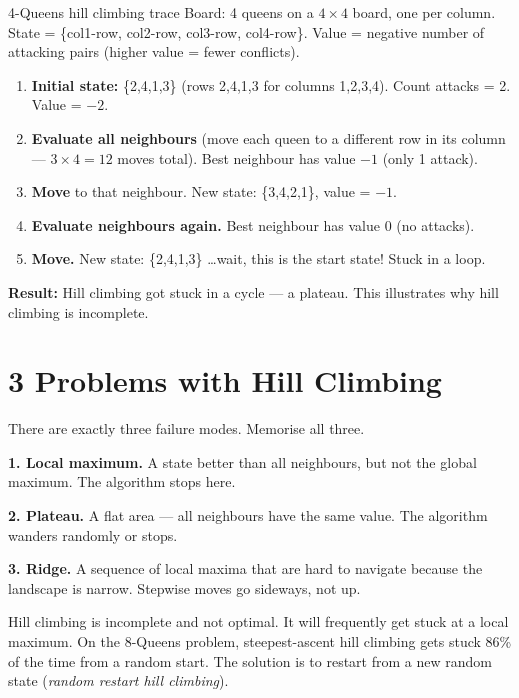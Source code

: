 \documentclass[a4paper,11pt]{article}
\begin{document}
\begin{worked}{4-Queens hill climbing trace}
Board: 4 queens on a $4\times4$ board, one per column. State = \{col1-row, col2-row, col3-row, col4-row\}. Value = negative number of attacking pairs (higher value = fewer conflicts).

\begin{enumerate}[label=\textbf{Step \arabic*.}]
  \item \textbf{Initial state:} \{2,4,1,3\} (rows 2,4,1,3 for columns 1,2,3,4). Count attacks = 2. Value = $-2$.
  \item \textbf{Evaluate all neighbours} (move each queen to a different row in its column — $3 \times 4 = 12$ moves total). Best neighbour has value $-1$ (only 1 attack).
  \item \textbf{Move} to that neighbour. New state: \{3,4,2,1\}, value = $-1$.
  \item \textbf{Evaluate neighbours again.} Best neighbour has value $0$ (no attacks).
  \item \textbf{Move.} New state: \{2,4,1,3\} \ldots wait, this is the start state! Stuck in a loop.
\end{enumerate}
\textbf{Result:} Hill climbing got stuck in a cycle — a plateau. This illustrates why hill climbing is incomplete.
\end{worked}

\section{3 \quad Problems with Hill Climbing}

There are exactly three failure modes. Memorise all three.

\textbf{1. Local maximum.} A state better than all neighbours, but not the global maximum. The algorithm stops here.

\textbf{2. Plateau.} A flat area — all neighbours have the same value. The algorithm wanders randomly or stops.

\textbf{3. Ridge.} A sequence of local maxima that are hard to navigate because the landscape is narrow. Stepwise moves go sideways, not up.

\begin{watchout}
Hill climbing is incomplete and not optimal. It will frequently get stuck at a local maximum. On the 8-Queens problem, steepest-ascent hill climbing gets stuck 86\% of the time from a random start. The solution is to restart from a new random state (\emph{random restart hill climbing}).
\end{watchout}
\end{document}
